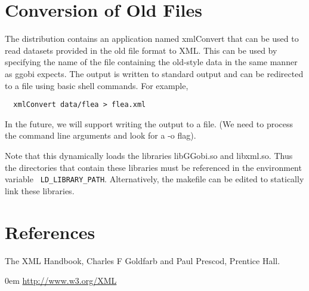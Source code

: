 \documentclass{article}
\def\strip#1>{}
\def\Escape#1{\def\next{#1}%
  {\frenchspacing\expandafter\strip\meaning\next}}
\def\Env#1{{\gray\texttt{\Escape{#1}}}}
\begin{document}
\section{Conversion of Old Files}
The distribution contains an application named xmlConvert that can be
used to read datasets provided in the old file format to XML.  This
can be used by specifying the name of the file containing the
old-style data in the same manner as ggobi expects.
The output is written to standard output
and can be redirected to a file using basic shell commands.
For example,
\begin{verbatim}
  xmlConvert data/flea > flea.xml
\end{verbatim}
In the future, we will support writing the output to a file. (We need
to process the command line arguments and look for a -o flag).

Note that this dynamically loads the libraries libGGobi.so and
libxml.so.  Thus the directories that contain these libraries must be
referenced in the environment variable 
\Env{LD_LIBRARY_PATH}.
Alternatively, the makefile can be edited to statically link these
libraries.

\begin{comment}
\section{Compilation}
To activate the XML mechanism, define the variable
\Env{USE_XML} in  local.config.

When we use autoconf, this can be done by
\begin{verbatim}
  ./configure --with-xml
\end{verbatim}

This requires the XML parsing library libxml (also know as gnome-xml)
by Daniel Veillard.  (\texttt{Daniel.Veillard@w3.org}).  See
\Escape{http://xmlsoft.org}
\end{comment}


\section{References}
The XML Handbook, Charles F Goldfarb and Paul Prescod,
 Prentice Hall.

\vspace{1em} \parindent 0em
\url{http://www.w3.org/XML}
\end{document}

